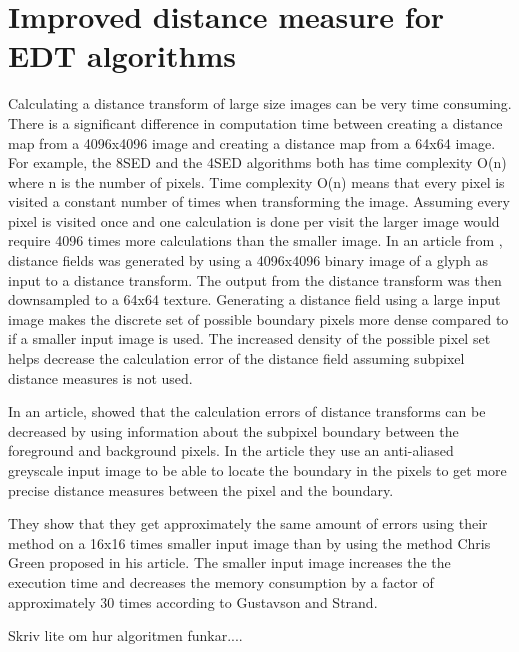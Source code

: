 \section{Improved distance measure for EDT algorithms}\label{limitEDT}
Calculating a distance transform of large size images can be very time consuming. There is a significant difference in computation time between creating a distance map from a 4096x4096 image and creating a distance map from a 64x64 image. For example, the 8SED and the 4SED algorithms both has time complexity O(n) where n is the number of pixels. Time complexity O(n) means that every pixel is visited a constant number of times when transforming the image. Assuming every pixel is visited once and one calculation is done per visit the larger image would require 4096 times more calculations than the smaller image. In an article from \citet{Green:2007}, distance fields was generated by using a 4096x4096 binary image of a glyph as input to a distance transform. The output from the distance transform was then downsampled to a 64x64 texture. Generating a distance field using a large input image makes the discrete set of possible boundary pixels more dense compared to if a smaller input image is used. The increased density of the possible pixel set helps decrease the calculation error of the distance field assuming subpixel distance measures is not used.

In an article, \citet{Gustavson:2011} showed that the calculation errors of distance transforms can be decreased by using information about the subpixel boundary between the foreground and background pixels. In the article they use an anti-aliased greyscale input image to be able to locate the boundary in the pixels to get more precise distance measures between the pixel and the boundary. 

 They show that they get approximately the same amount of errors using their method on a 16x16 times smaller input image than by using the method Chris Green proposed in his article. The smaller input image increases the the execution time and decreases the memory consumption by a factor of approximately 30 times according to Gustavson and Strand.

Skriv lite om hur algoritmen funkar....
